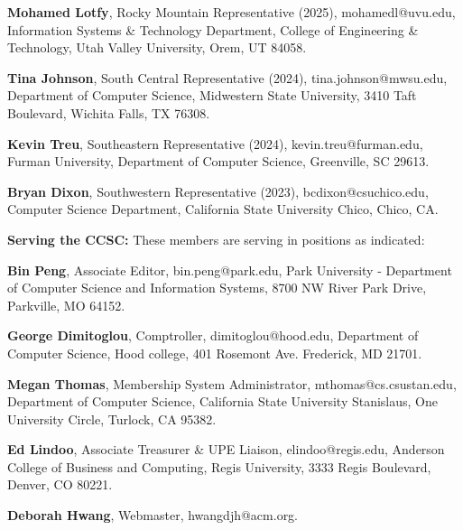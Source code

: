 \documentclass{article}
\begin{document}
\begin{multicols}{2}
\begin{raggedright}
{\noindent
\textbf{Mohamed Lotfy}, Rocky Mountain Representative (2025),
mohamedl@uvu.edu, Information Systems \& Technology Department,
College of Engineering \& Technology, Utah Valley University, Orem, UT 84058.

\noindent
\textbf{Tina Johnson}, South Central Representative (2024),
tina.johnson@mwsu.edu, Department of Computer Science, Midwestern State University,
3410 Taft Boulevard, Wichita Falls, TX 76308.

\noindent
\textbf{Kevin Treu}, Southeastern Representative (2024),
kevin.treu@furman.edu, Furman University, Department of Computer Science, Greenville,
SC 29613.

\noindent
\textbf{Bryan Dixon}, Southwestern Representative (2023),
bcdixon@csuchico.edu, Computer Science Department, California State University Chico, Chico, CA.
}
\end{raggedright}
\end{multicols}

\clearpage

\begin{multicols}{2}
\begin{raggedright}

\small{
\vspace{0.2in}
\noindent
\textbf{Serving the CCSC:} These members are serving in positions as indicated:

\noindent
\textbf{Bin Peng}, Associate Editor,
bin.peng@park.edu, Park University - Department of Computer Science and
Information Systems, 8700 NW River Park Drive, Parkville, MO 64152.

\noindent
\textbf{George Dimitoglou}, Comptroller,
dimitoglou@hood.edu,
Department of Computer Science, Hood college,
401 Rosemont Ave. Frederick, MD 21701.

\noindent
\textbf{Megan Thomas}, Membership System Administrator,
mthomas@cs.csustan.edu, Department of Computer Science, California State University Stanislaus,
One University Circle, Turlock, CA 95382.

\noindent
\textbf{Ed Lindoo}, Associate Treasurer \& UPE Liaison, elindoo@regis.edu,
Anderson College of Business and Computing, Regis University, 3333 Regis Boulevard, Denver, CO 80221.

\noindent
\textbf{Deborah Hwang}, Webmaster, hwangdjh@acm.org.

}
\end{raggedright}
\end{multicols}
\end{document}
